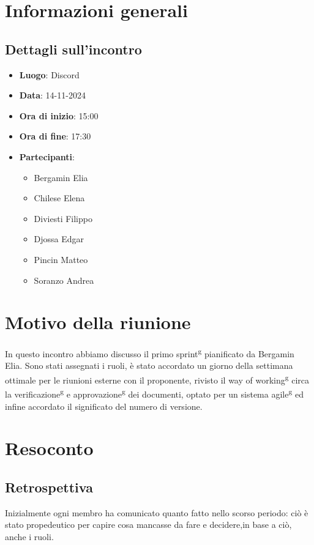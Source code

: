 \section{Informazioni generali}
\subsection{Dettagli sull'incontro}
\begin{itemize}
    \item \textbf{Luogo}: Discord
    \item \textbf{Data}: 14-11-2024
    \item \textbf{Ora di inizio}: 15:00
    \item \textbf{Ora di fine}: 17:30
    \item \textbf{Partecipanti}: 
    \begin{itemize}
        \item Bergamin Elia
        \item Chilese Elena
        \item Diviesti Filippo
        \item Djossa Edgar
        \item Pincin Matteo 
        \item Soranzo Andrea  
    \end{itemize}
\end{itemize}

\section{Motivo della riunione}
In questo incontro abbiamo discusso il primo sprint\textsuperscript{g} pianificato da Bergamin Elia. Sono stati assegnati i ruoli, è stato accordato un giorno della settimana ottimale per le riunioni
esterne con il proponente, rivisto il way of working\textsuperscript{g} circa la verificazione\textsuperscript{g} e approvazione\textsuperscript{g} dei documenti, optato per un sistema agile\textsuperscript{g} ed infine accordato il significato
del numero di versione.
\section{Resoconto}
\subsection{Retrospettiva}
Inizialmente ogni membro ha comunicato quanto fatto nello scorso periodo: ciò è stato propedeutico per capire cosa mancasse da fare e decidere,in base a ciò, anche i ruoli.

